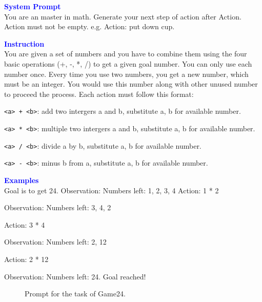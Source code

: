 \begin{tcolorbox}[breakable,title=Prompt of the Game24 ]
\textbf{\textcolor{blue}{System Prompt}}\\ 
You are an master in math. Generate your next step of action after Action. Action must not be empty. e.g. Action: put down cup.\\
\textbf{\textcolor{blue}{Instruction}}\\
You are given a set of numbers and you have to combine them using the four basic operations (+, -, *, /) to get a given goal number. You can only use each number once. Every time you use two numbers, you get a new number, which must be an integer. You would use this number along with other unused number to proceed the process. Each action must follow this format:

\verb|<a> + <b>|: add two intergers a and b, substitute a, b for available number. 
 
\verb|<a> * <b>|: multiple two intergers a and b, substitute a, b for available number. 

\verb|<a> / <b>|: divide a by b, substitute a, b for available number.
 
\verb|<a> - <b>|: minus b from a, substitute a, b for available number.

\textbf{\textcolor{blue}{Examples}}\\
Goal is to get 24. Observation: Numbers left: 1, 2, 3, 4
Action: 1 * 2 

Observation: Numbers left: 3, 4, 2

Action: 3 * 4 

Observation: Numbers left: 2, 12

Action: 2 * 12 

Observation: Numbers left: 24. Goal reached!

\end{tcolorbox}
\begin{figure}[!h]
    \vspace{0.01cm}
    \caption{Prompt for the task of Game24.}
    \label{fig:alfworld_prompt}
\end{figure}